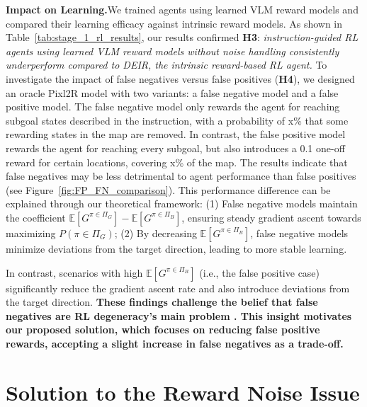 \documentclass{article}
\theoremstyle{plain}
\theoremstyle{definition}
\theoremstyle{remark}
\begin{document}
\noindent\textbf{Impact on Learning.}\quad We trained agents using learned VLM reward models and compared their learning efficacy against intrinsic reward models. As shown in Table~\ref{tab:stage_1_rl_results}, our results confirmed \textbf{H3}: \textit{instruction-guided RL agents using learned VLM reward models without noise handling consistently underperform compared to DEIR, the intrinsic reward-based RL agent.} To investigate the impact of false negatives versus false positives (\textbf{H4}), we designed an oracle Pixl2R model with two variants: a false negative model and a false positive model. The false negative model only rewards the agent for reaching subgoal states described in the instruction, with a probability of x\% that some rewarding states in the map are removed. In contrast, the false positive model rewards the agent for reaching every subgoal, but also introduces a 0.1 one-off reward for certain locations, covering x\% of the map. The results indicate that false negatives may be less detrimental to agent performance than false positives (see Figure~\ref{fig:FP_FN_comparison}). This performance difference can be explained through our theoretical framework: \quad (1) False negative models maintain the coefficient $\mathbb{E}[G^{\pi \in \Pi_G}] - \mathbb{E}[G^{\pi \in \Pi_B}]$, ensuring steady gradient ascent towards maximizing $P(\pi \in \Pi_G)$;
\quad (2) By decreasing $\mathbb{E}[G^{\pi \in \Pi_B}]$, false negative models minimize deviations from the target direction, leading to more stable learning.

In contrast, scenarios with high $\mathbb{E}[G^{\pi \in \Pi_B}]$ (i.e., the false positive case) significantly reduce the gradient ascent rate and also introduce deviations from the target direction. \textbf{These findings challenge the belief that false negatives are RL degeneracy's main problem \citep{du2023guiding}. This insight motivates our proposed solution, which focuses on reducing false positive rewards, accepting a slight increase in false negatives as a trade-off.} 




\section{Solution to the Reward Noise Issue}
\end{document}
